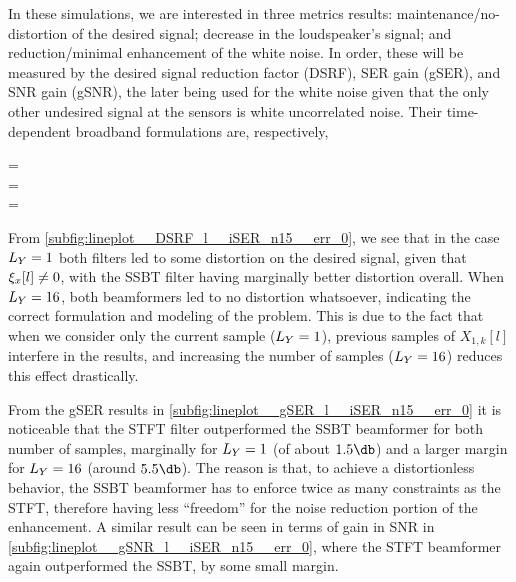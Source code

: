 In these simulations, we are interested in three metrics results: maintenance/no-distortion of the desired signal; decrease in the loudspeaker's signal; and reduction/minimal enhancement of the white noise. In order, these will be measured by the desired signal reduction factor (DSRF), SER gain (gSER), and SNR gain (gSNR), the later being used for the white noise given that the only other undesired signal at the sensors is white uncorrelated noise. Their time-dependent broadband formulations are, respectively,
\begin{subgather}
	\dsrf[l] =  \\
	\gser[l] =  \cdot {} \\
	\gsnr[l] =  \cdot {}
\end{subgather}

From \cref{subfig:lineplot__DSRF_l__iSER_n15__err_0}, we see that in the case $\Ly = 1$ both filters led to some distortion on the desired signal, given that $\xi_{x}[l] \neq 0$, with the SSBT filter having marginally better distortion overall. When $\Ly = 16$, both beamformers led to no distortion whatsoever, indicating the correct formulation and modeling of the problem. This is due to the fact that when we consider only the current sample ($\Ly = 1$), previous samples of $X_{1,k}[l]$ interfere in the results, and increasing the number of samples ($\Ly = 16$) reduces this effect drastically.

From the gSER results in \cref{subfig:lineplot__gSER_l__iSER_n15__err_0} it is noticeable that the STFT filter outperformed the SSBT beamformer for both number of samples, marginally for $\Ly = 1$ (of about $1.5\dB$) and a larger margin for $\Ly = 16$ (around $5.5 \dB$). The reason is that, to achieve a distortionless behavior, the SSBT beamformer has to enforce twice as many constraints as the STFT, therefore having less ``freedom'' for the noise reduction portion of the enhancement. A similar result can be seen in terms of gain in SNR in \cref{subfig:lineplot__gSNR_l__iSER_n15__err_0}, where the STFT beamformer again outperformed the SSBT, by some small margin.




